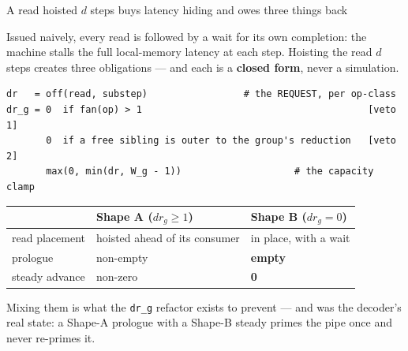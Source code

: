 \documentclass[aspectratio=169,9pt]{beamer}
\newcommand{\tsub}[1]{{\footnotesize\color{gray}#1}}
\newcommand{\key}[1]{\textcolor{acc}{\textbf{#1}}}
\newcommand{\bad}[1]{\textcolor{warn}{\textbf{#1}}}
\newcommand{\good}[1]{\textcolor{ok}{\textbf{#1}}}
\begin{document}
\begin{frame}[fragile]{A read hoisted $d$ steps buys latency hiding and owes three things back}

Issued naively, every read is followed by a wait for its own completion: the machine stalls the full
local-memory latency at each step. Hoisting the read $d$ steps creates three obligations --- and each
is a \key{closed form}, never a simulation.

\begin{center}
\end{center}

\begin{lstlisting}[style=pseudo]
dr   = off(read, substep)                 # the REQUEST, per op-class
dr_g = 0  if fan(op) > 1                                        [veto 1]
       0  if a free sibling is outer to the group's reduction   [veto 2]
       max(0, min(dr, W_g - 1))                    # the capacity clamp
\end{lstlisting}

\begin{center}\scriptsize
\begin{tabular}{lll}
\toprule
 & \good{Shape A} ($dr_g \ge 1$) & \bad{Shape B} ($dr_g = 0$) \\
\midrule
read placement & hoisted ahead of its consumer & in place, with a wait \\
prologue       & non-empty & \textbf{empty} \\
steady advance & non-zero  & \textbf{0} \\
\bottomrule
\end{tabular}
\end{center}

\tsub{Mixing them is what the \texttt{dr\_g} refactor exists to prevent --- and was the decoder's real state: a Shape-A prologue with a Shape-B steady primes the pipe once and never re-primes it.}
\end{frame}
\end{document}
